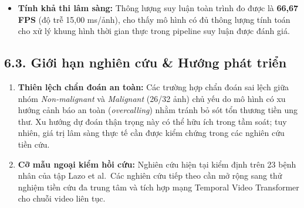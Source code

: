 \documentclass[
  10pt,
  a4paper,
  twocolumn]{article}
\providecommand{\tightlist}{%
  \setlength{\itemsep}{0pt}\setlength{\parskip}{0pt}}
\begin{document}
\begin{table}[htbp]
\centering
\caption{Bảng 12.}
\label{tab:table12}
\vspace{2pt}
\end{table}

\begin{itemize}
\tightlist
\item
  \textbf{Tính khả thi lâm sàng:} Thông lượng suy luận toàn trình đo
  được là \textbf{66,67 FPS} (độ trễ 15,00 ms/ảnh), cho thấy mô hình có
  đủ thông lượng tính toán cho xử lý khung hình thời gian thực trong
  pipeline suy luận được đánh giá.
\end{itemize}

\subsection{6.3. Giới hạn nghiên cứu \& Hướng phát
triển}\label{giux1edbi-hux1ea1n-nghiuxean-cux1ee9u-hux1b0ux1edbng-phuxe1t-triux1ec3n}

\begin{enumerate}
\def\labelenumi{\arabic{enumi}.}
\tightlist
\item
  \textbf{Thiên lệch chẩn đoán an toàn:} Các trường hợp chẩn đoán sai
  lệch giữa nhóm \emph{Non-malignant} và \emph{Malignant} (26/32 ảnh)
  chủ yếu do mô hình có xu hướng cảnh báo an toàn (\emph{overcalling})
  nhằm tránh bỏ sót tổn thương tiền ung thư. Xu hướng dự đoán thận trọng
  này có thể hữu ích trong tầm soát; tuy nhiên, giá trị lâm sàng thực tế
  cần được kiểm chứng trong các nghiên cứu tiền cứu.
\item
  \textbf{Cỡ mẫu ngoại kiểm hồi cứu:} Nghiên cứu hiện tại kiểm định trên
  23 bệnh nhân của tập Lazo et al.~Các nghiên cứu tiếp theo cần mở rộng
  sang thử nghiệm tiền cứu đa trung tâm và tích hợp mạng Temporal Video
  Transformer cho chuỗi video liên tục.
\end{enumerate}
\end{document}
